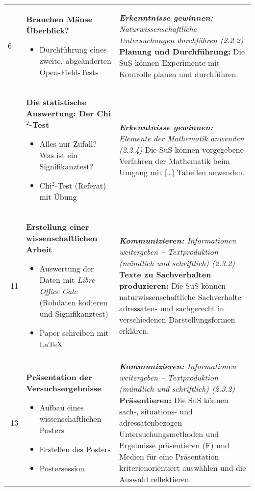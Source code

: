 \begin{longtable}{lp{5cm}X}
6  & \textbf{Brauchen Mäuse Überblick?}
	\begin{itemize}
		\item  Durchführung eines zweite, abgeänderten Open-Field-Tests
	\end{itemize} & 
	\textit{\textbf{Erkenntnisse gewinnen:} Naturwissenschaftliche Untersuchungen durchführen (2.2.2)}\newline
		\textbf{Planung und Durchführung:} Die SuS können Experimente mit Kontrolle planen und durchführen.
	\\ \addlinespace[.5em]
7	& \textbf{Die statistische Auswertung: Der Chi$^2$-Test}
	\begin{itemize}
		\item Alles nur Zufall? Was ist ein Signifikanztest?
		\item Chi$^2$-Test (Referat) mit Übung
	\end{itemize} & 
	\textit{\textbf{Erkenntnisse gewinnen:} Elemente der Mathematik anwenden (2.2.4)}\newline
		Die SuS können vorgegebene Verfahren der Mathematik beim Umgang mit […] Tabellen anwenden.
	\\ \addlinespace[.5em]
8-11 & 	\textbf{Erstellung einer wissenschaftlichen Arbeit}
	\begin{itemize}
		\item Auswertung der Daten mit \textit{Libre Office Calc} (Rohdaten kodieren und Signifikanztest)
		\item Paper schreiben mit \LaTeX
	\end{itemize} &  
	\textit{\textbf{Kommunizieren:} Informationen weitergeben – Textproduktion (mündlich und schriftlich) (2.3.2)}\newline
		\textbf{Texte zu Sachverhalten produzieren:} Die SuS können naturwissenschaftliche Sachverhalte adressaten- und sachgerecht in verschiedenen Darstellungsformen erklären.
	\\ \addlinespace[.5em]
12-13 & 	\textbf{Präsentation der Versuchsergebnisse}
	\begin{itemize}
		\item Aufbau eines wissenschaftlichen Posters
		\item Erstellen des Posters
		\item Postersession
	\end{itemize} & 
	\textit{\textbf{Kommunizieren:} Informationen weitergeben – Textproduktion (mündlich und schriftlich) (2.3.2)}\newline
		\textbf{Präsentieren:} Die SuS können sach-, situations- und adressatenbezogen Untersuchungsmethoden und Ergebnisse präsentieren (F) und 
		Medien für eine Präsentation kriterienorientiert auswählen und die Auswahl reflektieren. \\
\bottomrule
\end{longtable}